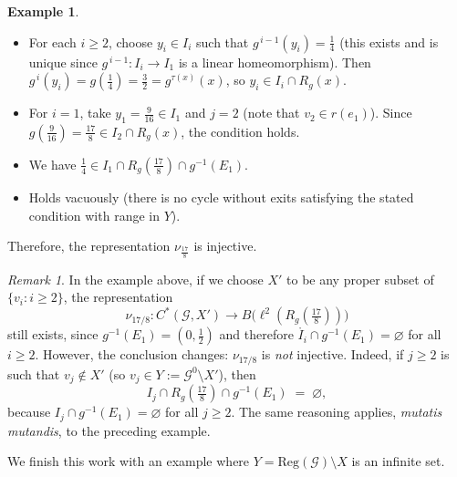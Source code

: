 \documentclass[12pt, reqno]{amsart}
\theoremstyle{definition}
\newtheorem{example}[theorem]{Example}
\theoremstyle{remark}
\newtheorem{remark}[theorem]{Remark}
\numberwithin{equation}{section}
\begin{document}
\begin{example}
\begin{itemize}
  \item[(1)] For each $i\ge 2$, choose $y_i\in I_i$ such that
             $g^{\,i-1}(y_i)=\tfrac14$ (this exists and is unique since
             $g^{\,i-1}:I_i\to I_1$ is a linear homeomorphism). Then
             $g^{\,i}(y_i)=g(\tfrac14)=\tfrac32=g^{\tau(x)}(x)$, so
             $y_i\in I_i\cap R_g(x)$.
  \item[(2)] For $i=1$, take $y_1=\tfrac{9}{16}\in I_1$ and $j=2$ (note that
             $v_2\in r(e_1)$). Since $g(\tfrac{9}{16})=\tfrac{17}{8}\in I_2\cap R_g(x)$,
             the condition holds.
  \item[(3)] We have $\tfrac14\in I_1\cap R_g(\tfrac{17}{8})\cap g^{-1}(E_1)$.
  \item[(4)] Holds vacuously (there is no cycle without exits satisfying the
             stated condition with range in $Y$).
\end{itemize}
Therefore, the representation $\nu_{\frac{17}{8}}$ is injective.
\end{example}

\begin{remark}
In the example above, if we choose $X'$ to be any proper subset of $\{v_i : i \ge 2\}$, the representation
\[
\nu_{17/8} \colon C^*(\mathcal{G},X') \longrightarrow B\bigl(\ell^2(R_g(\tfrac{17}{8}))\bigr)
\]
still exists, since $g^{-1}(E_1)=(0,\tfrac{1}{2})$ and therefore $\mathring{I_i}\cap g^{-1}(E_1)=\varnothing$ for all $i\ge 2$. However, the conclusion changes: $\nu_{17/8}$ is \emph{not} injective. Indeed, if $j\ge 2$ is such that $v_j\notin X'$ (so $v_j\in Y:=\mathcal{G}^0\setminus X'$), then
\[
I_j \cap R_g(\tfrac{17}{8}) \cap g^{-1}(E_1) \;=\; \varnothing,
\]
because $I_j \cap g^{-1}(E_1)=\varnothing$ for all $j\ge 2$. The same reasoning applies, \emph{mutatis mutandis}, to the preceding example.
\end{remark}


We finish this work with an example where $Y=\mathrm{Reg}(\mathcal{G})\setminus X$ is an infinite set.
\end{document}
